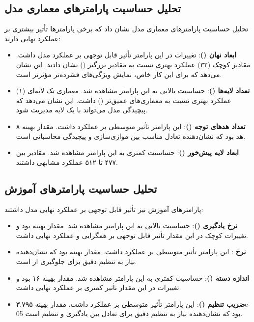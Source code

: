 \subsection{تحلیل حساسیت پارامترهای معماری مدل}
تحلیل حساسیت پارامترهای معماری مدل نشان داد که برخی پارامترها تأثیر بیشتری بر عملکرد نهایی دارند:

\begin{itemize}
    \renewcommand{\labelitemi}{\lr{$\bullet$}}
    \item \textbf{ابعاد نهان ()}: تغییرات در این پارامتر تأثیر قابل توجهی بر عملکرد مدل داشت. مقادیر کوچک (۳۲) عملکرد بهتری نسبت به مقادیر بزرگتر () نشان دادند. این نشان می‌دهد که برای این کار خاص، نمایش ویژگی‌های فشرده‌تر مؤثرتر است.
    
    \item \textbf{تعداد لایه‌ها ()}: حساسیت بالایی به این پارامتر مشاهده شد. معماری تک لایه‌ای (۱) عملکرد بهتری نسبت به معماری‌های عمیق‌تر () داشت. این نشان می‌دهد که پیچیدگی مدل می‌تواند با یک لایه مدیریت شود.
    
    \item \textbf{تعداد هدهای توجه ()}: این پارامتر تأثیر متوسطی بر عملکرد داشت. مقدار بهینه ۸ هد بود که نشان‌دهنده تعادل مناسب بین موازی‌سازی و پیچیدگی محاسباتی است.
    
    \item \textbf{ابعاد لایه پیش‌خور ()}: حساسیت کمتری به این پارامتر مشاهده شد. مقادیر بین ۴۷۷ تا ۵۱۲ عملکرد مشابهی داشتند.
\end{itemize}

\subsection{تحلیل حساسیت پارامترهای آموزش}
پارامترهای آموزش نیز تأثیر قابل توجهی بر عملکرد نهایی مدل داشتند:

\begin{itemize}
    \renewcommand{\labelitemi}{\lr{$\bullet$}}
    \item \textbf{نرخ یادگیری ()}: حساسیت بالایی به این پارامتر مشاهده شد. مقدار بهینه  بود و تغییرات کوچک در این مقدار تأثیر قابل توجهی بر همگرایی و عملکرد نهایی داشت.
    
    \item \textbf{نرخ }: این پارامتر تأثیر متوسطی بر عملکرد داشت. مقدار بهینه  بود که نشان‌دهنده نیاز به تنظیم دقیق برای جلوگیری از  است.
    
    \item \textbf{اندازه دسته ()}: حساسیت کمتری به این پارامتر مشاهده شد. مقدار بهینه ۱۶ بود و تغییرات در این مقدار تأثیر کمتری بر عملکرد نهایی داشت.
    
    \item \textbf{ضریب تنظیم ()}: این پارامتر تأثیر متوسطی بر عملکرد داشت. مقدار بهینه ۳.۷۹۵e-05 بود که نشان‌دهنده نیاز به تنظیم دقیق برای تعادل بین یادگیری و تنظیم است.
\end{itemize}

